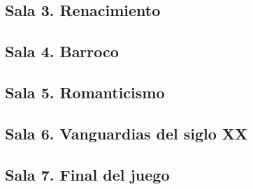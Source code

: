 \subsection{Sala 3. Renacimiento}

\subsection{Sala 4. Barroco}

\subsection{Sala 5. Romanticismo}

\subsection{Sala 6. Vanguardias del siglo XX}

\subsection{Sala 7. Final del juego}



